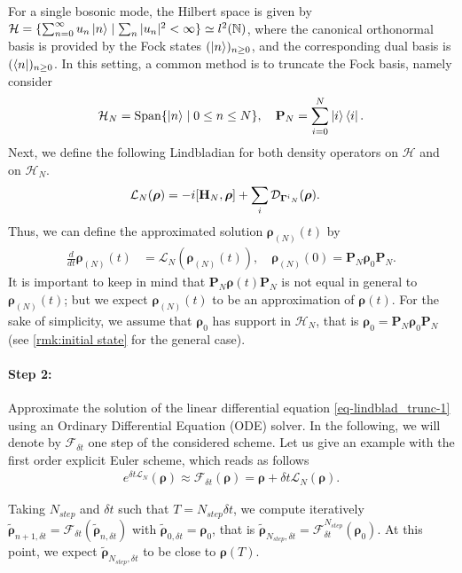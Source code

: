 \documentclass[a4paper,onecolumn,amsmath,amssymb,amsfonts,accepted=2026-03-06]{quantumarticle}
\newcommand{\xL}{\mathcal{L}}
\newcommand{\xH}{\mathcal{H}}
\newcommand{\xF}{\mathcal{F}}
\newcommand{\xN}{\mathbb{N}}
\newcommand{\cD}{\mathcal D}
\newcommand{\LL}{{\mathbf{\Gamma}}}
\newcommand{\Hamil}{{\bf H}}
\newcommand{\Proj}[1]{\mathbf{P}_{#1}}
\newcommand{\rN}{{\boldsymbol{\rho}_{(N)}}}
\begin{document}
For a single bosonic mode, the Hilbert space is given by $\xH = \{ \sum_{n=0}^\infty u_n \ket{n} \mid \sum_n |u_n|^2< \infty\} \simeq  l^2(\xN)$, where the canonical orthonormal basis is provided by the Fock states $(\ket{n})_{n \geq 0}$, and the corresponding dual basis is $(\bra{n})_{n \geq 0}$. In this setting, a common method is to truncate the Fock basis, namely consider
\begin{align}
    \xH_N=\operatorname{Span} \{\ket{n}\mid 0 \leq n  \leq N\}, \quad \Proj{N}=\sum_{i=0}^{N}\ket{i}\bra{i}.
\end{align}
Next, we define the following Lindbladian for both density operators on $\xH$ and on $\xH_N$.
\begin{align}
    \label{truncated_lindblad}
    \xL_N(\boldsymbol{\rho})& =-i[\Hamil_N,\boldsymbol{\rho}] + \sum_i \cD_{{\LL^i}_N}(\boldsymbol{\rho}).
\end{align}
Thus, we can define the approximated solution $\rN(t)$ by
\begin{align}
    \label{eq-lindblad_trunc-1}
    \frac{d}{dt} \rN(t)&= \xL_N(\rN(t)), \quad \rN(0)=\Proj{N}\boldsymbol{\rho}_0\Proj{N}.
\end{align}
It is important to keep in mind that $\Proj{N}\boldsymbol{\rho}(t)\Proj{N}$ is not equal in general to $\rN(t)$; but we expect $\rN(t)$ to be an approximation of $\boldsymbol{\rho}(t)$. For the sake of simplicity, we assume that $\boldsymbol{\rho}_0$ has support in $\xH_N$, that is $\boldsymbol{\rho}_0=\Proj{N}\boldsymbol{\rho}_0\Proj{N}$ (see \cref{rmk:initial state} for the general case).

\paragraph{Step 2:} Approximate the solution of the linear differential equation \cref{eq-lindblad_trunc-1} using an Ordinary Differential Equation (ODE) solver. In the following, we will denote by $\xF_{\delta t}$ one step of the considered scheme. Let us give an example with the first order explicit Euler scheme, which reads as follows
\begin{align}
    e^{\delta t \xL_N} (\boldsymbol{\rho}) \approx \xF_{\delta t}(\boldsymbol{\rho})= \boldsymbol{\rho} + \delta t \xL_N(\boldsymbol{\rho}).
\end{align}


Taking $N_{step}$ and $ \delta t$ such that $T=N_{step} \delta t$, we compute iteratively $\tilde{ \boldsymbol{\rho}}_{n+1,\delta t}= \xF_{\delta t}(\tilde{ \boldsymbol{\rho}}_{n,\delta t})$ with $\tilde{ \boldsymbol{\rho}}_{0,\delta t}=\boldsymbol{\rho}_0$, that is $\tilde{ \boldsymbol{\rho}}_{N_{step},\delta t}= \xF_{\delta t}^{N_{step}}(\boldsymbol{\rho}_0)$. At this point, we expect $\tilde{ \boldsymbol{\rho}}_{N_{step},\delta t}$ to be close to $\boldsymbol{\rho}(T)$.
\end{document}

